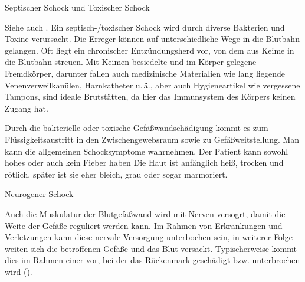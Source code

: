 \TextSlide
{Septischer Schock und Toxischer Schock}
{%
\label{topic:schock-septischer}
\label{topic:schock-toxischer}
Siehe auch .
%
Ein septisch-/toxischer
Schock wird durch diverse Bakterien und Toxine verursacht.
Die Erreger können auf unterschiedliche Wege in die Blutbahn
gelangen. Oft liegt ein chronischer Entzündungsherd vor, von
dem aus Keime in die Blutbahn streuen.  Mit Keimen
besiedelte und im Körper gelegene Fremdkörper, darunter
fallen auch medizinische Materialien wie
lang liegende Venenverweilkanülen, Harnkatheter u.\,ä., aber
auch Hygieneartikel wie vergessene Tampons, sind ideale
Brutstätten, da hier das Immunsystem des Körpers keinen Zugang hat. 

Durch die bakterielle oder toxische Gefäßwandschädigung kommt es
zum Flüssigkeitsaustritt in den Zwischengewebsraum sowie zu Gefäßweitstellung.
Man kann die allgemeinen Schocksymptome wahrnehmen. Der
Patient kann sowohl hohes  oder auch kein Fieber haben
Die Haut ist anfänglich heiß, trocken und rötlich, später
ist sie eher bleich, grau oder sogar marmoriert.
}
{}
{}
{}
{}



\TextSlide
{Neurogener Schock}
{%
Auch die Muskulatur der Blutgefäßwand wird mit Nerven
versogrt, damit die Weite der Gefäße reguliert werden kann.
Im Rahmen von Erkrankungen und Verletzungen kann diese
nervale Versorgung unterbochen sein, in weiterer Folge
weiten sich die betroffenen Gefäße und das Blut versackt. 
Typischerweise kommt dies im Rahmen einer
 vor, bei der das Rückenmark
geschädigt bzw. unterbrochen wird ().

}
{}
{}
{}
{}

\label{topic:schockbekaempfung}
\begin{Synopsis}
\end{Synopsis}




